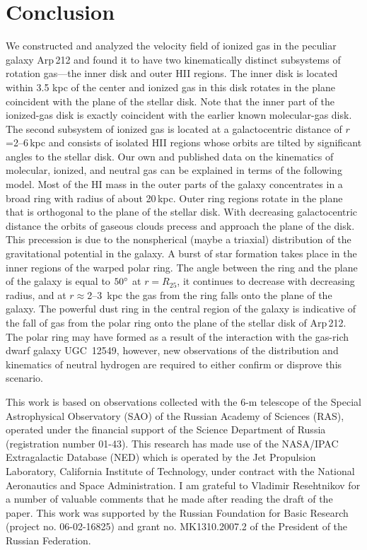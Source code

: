 \documentclass{ab}
\def\degr{\hbox{$^\circ$}}
\begin{document}
\section{Conclusion}

\label{results:Moiseev_n}

We constructed and analyzed the velocity field of ionized gas in
the peculiar galaxy Arp\,212 and found it to have two
kinematically distinct subsystems of rotation gas---the inner disk
and outer HII regions. The inner disk is located within 3.5 kpc of
the center and ionized gas in this disk rotates in the plane
coincident with the plane of the stellar disk. Note that the inner
part of the ionized-gas disk is exactly coincident with the
earlier known molecular-gas disk. The second subsystem of ionized
gas is located at a galactocentric distance of
\mbox{$r$=2--6\,kpc} and consists of isolated HII regions whose
orbits are tilted by significant angles to the stellar disk. Our
own and published data on the kinematics of molecular, ionized,
and neutral gas can be explained in terms of the following model.
Most of the HI mass in the outer parts of the galaxy concentrates
in a broad ring with radius of about 20\,kpc. Outer ring regions
rotate in the plane that is orthogonal to the plane of the stellar
disk. With decreasing galactocentric distance the orbits of
gaseous clouds precess and approach the plane of the disk. This
precession is due to the nonspherical   (maybe a triaxial) distribution of the gravitational potential in the galaxy.
A burst of star formation takes place in the inner regions of the
warped polar ring. The angle between the ring and the plane of the
galaxy is equal to $50\degr$ at $r=R_{25}$, it continues to
decrease with decreasing  radius, and at $r\approx$2--3~kpc the gas from the ring falls onto the plane of the galaxy.   The powerful dust ring in the central region of the galaxy is indicative of the fall of gas from the polar ring onto the plane of the stellar disk of  Arp\,212. The polar ring may have formed as a result of the interaction with the gas-rich dwarf galaxy UGC~12549, however, new observations of the distribution and kinematics of neutral hydrogen are required to either confirm or disprove this scenario.


\begin{acknowledgements}
This work is based on observations collected with the 6-m telescope of the Special Astrophysical Observatory (SAO) of the Russian Academy of Sciences
(RAS), operated under the financial support of the Science Department of Russia (registration number 01-43). This research has made use of the NASA/IPAC Extragalactic Database (NED) which is operated by the Jet Propulsion Laboratory, California Institute of Technology, under contract with the
National Aeronautics and Space Administration. I am grateful to Vladimir Resehtnikov for a number of valuable comments that he made after reading the draft of the paper. This work was supported by the Russian Foundation for Basic Research (project no. 06-02-16825) and grant no. MK1310.2007.2 of the President of the Russian Federation.
\end{acknowledgements}
\end{document}
